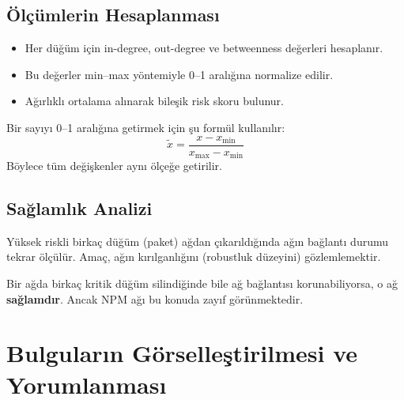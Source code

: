 \documentclass[11pt,a4paper]{article}
\begin{document}
\subsection{Ölçümlerin Hesaplanması}
\begin{itemize}
  \item Her düğüm için in-degree, out-degree ve betweenness değerleri hesaplanır.
  \item Bu değerler min–max yöntemiyle 0–1 aralığına normalize edilir.
  \item Ağırlıklı ortalama alınarak bileşik risk skoru bulunur.
\end{itemize}

\begin{info}
Bir sayıyı 0–1 aralığına getirmek için şu formül kullanılır:
\[\tilde{x} = \frac{x - x_{\min}}{x_{\max} - x_{\min}}\]
Böylece tüm değişkenler aynı ölçeğe getirilir.
\end{info}

\subsection{Sağlamlık Analizi}
Yüksek riskli birkaç düğüm (paket) ağdan çıkarıldığında ağın bağlantı durumu tekrar ölçülür. 
Amaç, ağın kırılganlığını (robustluk düzeyini) gözlemlemektir.

\begin{tipbox}
Bir ağda birkaç kritik düğüm silindiğinde bile ağ bağlantısı korunabiliyorsa, o ağ \textbf{sağlamdır}. Ancak NPM ağı bu konuda zayıf görünmektedir.
\end{tipbox}

\section{Bulguların Görselleştirilmesi ve Yorumlanması}
\end{document}
